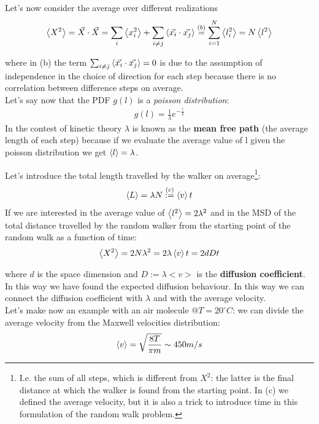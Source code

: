 \documentclass[\main/main.tex]{subfiles}
\begin{document}
Let's now consider the average over different realizations
\begin{eqnarray}
\left\langle X^2 \right\rangle=\Vec{X}\cdot\Vec{X}=\sum_i\left\langle x_i^2 \right\rangle+\sum_{i\neq j}\left\langle \Vec{x_i}\cdot\Vec{x_j} \right\rangle \overset{(b)}{=} \sum_{i=1}^N\left\langle l_i^2 \right\rangle=N\left\langle l^2 \right\rangle
\end{eqnarray}

where in (b) the term $\sum_{i\neq j}\left\langle \Vec{x_i}\cdot\Vec{x_j} \right\rangle=0$ is due to the assumption of independence in the choice of direction for each step because there is no correlation between difference steps on average.  \\

Let's say now that the PDF $g(l)$ is a \textit{poisson distribution}:
\begin{eqnarray}
g(l)=\frac{1}{\lambda}e^{-\frac{l}{\lambda}}
\end{eqnarray}
In the contest of kinetic theory $\lambda$ is known as the \textbf{mean free path} (the average length of each step) because if we evaluate the average value of l given the poisson distribution we get $\left\langle l \right\rangle=\lambda$.

Let's introduce the total length travelled by the walker on average\footnote{I.e. the sum of all steps, which is different from $X^2$: the latter is the final distance at which the walker is found from the starting point. In (c) we defined the average velocity, but it is also a trick to introduce time in this formulation of the random walk problem.}:
\begin{eqnarray}
\left\langle L \right\rangle=\lambda N \overset{(c)}{:=} \left\langle v \right\rangle t 
\end{eqnarray}
If we are interested in the average value of $\left\langle l^2 \right\rangle=2\lambda^2$ and in the MSD of the total distance travelled by the random walker from the starting point of the random walk as a function of time:
\begin{eqnarray}
\left\langle X^2 \right\rangle=2N\lambda^2=2 \lambda\left\langle v \right\rangle t=2dDt
\end{eqnarray}

where $d$ is the space dimension  and $D:=\lambda<v>$ is the \textbf{diffusion coefficient}. In this way we have found the expected diffusion behaviour. In this way we can connect the diffusion coefficient with $\lambda$ and with the average velocity. \\

Let's make now an example with an air molecule @$T=20^{\circ}C$: we can divide the average velocity from the Maxwell velocities distribution:
\begin{eqnarray}
\left\langle v \right\rangle=\sqrt{\frac{8T}{\pi m}} \sim 450 m/s
\end{eqnarray}
\end{document}
